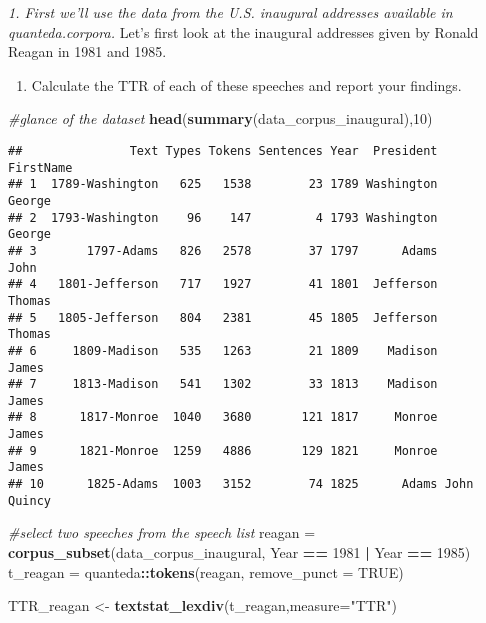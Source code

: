 \documentclass[]{article}
\newenvironment{Shaded}{\begin{snugshade}}{\end{snugshade}}
\newcommand{\KeywordTok}[1]{\textcolor[rgb]{0.13,0.29,0.53}{\textbf{#1}}}
\newcommand{\DataTypeTok}[1]{\textcolor[rgb]{0.13,0.29,0.53}{#1}}
\newcommand{\DecValTok}[1]{\textcolor[rgb]{0.00,0.00,0.81}{#1}}
\newcommand{\StringTok}[1]{\textcolor[rgb]{0.31,0.60,0.02}{#1}}
\newcommand{\CommentTok}[1]{\textcolor[rgb]{0.56,0.35,0.01}{\textit{#1}}}
\newcommand{\OtherTok}[1]{\textcolor[rgb]{0.56,0.35,0.01}{#1}}
\newcommand{\OperatorTok}[1]{\textcolor[rgb]{0.81,0.36,0.00}{\textbf{#1}}}
\newcommand{\NormalTok}[1]{#1}
\providecommand{\tightlist}{%
  \setlength{\itemsep}{0pt}\setlength{\parskip}{0pt}}
\begin{document}
\emph{1. First we'll use the data from the U.S. inaugural addresses
available in quanteda.corpora.} Let's first look at the inaugural
addresses given by Ronald Reagan in 1981 and 1985.

\begin{enumerate}
\def\labelenumi{(\alph{enumi})}
\tightlist
\item
  Calculate the TTR of each of these speeches and report your findings.
\end{enumerate}

\begin{Shaded}
\begin{Highlighting}[]
\CommentTok{#glance of the dataset}
\KeywordTok{head}\NormalTok{(}\KeywordTok{summary}\NormalTok{(data_corpus_inaugural),}\DecValTok{10}\NormalTok{)}
\end{Highlighting}
\end{Shaded}

\begin{verbatim}
##               Text Types Tokens Sentences Year  President   FirstName
## 1  1789-Washington   625   1538        23 1789 Washington      George
## 2  1793-Washington    96    147         4 1793 Washington      George
## 3       1797-Adams   826   2578        37 1797      Adams        John
## 4   1801-Jefferson   717   1927        41 1801  Jefferson      Thomas
## 5   1805-Jefferson   804   2381        45 1805  Jefferson      Thomas
## 6     1809-Madison   535   1263        21 1809    Madison       James
## 7     1813-Madison   541   1302        33 1813    Madison       James
## 8      1817-Monroe  1040   3680       121 1817     Monroe       James
## 9      1821-Monroe  1259   4886       129 1821     Monroe       James
## 10      1825-Adams  1003   3152        74 1825      Adams John Quincy
\end{verbatim}

\begin{Shaded}
\begin{Highlighting}[]
\CommentTok{#select two speeches from the speech list}
\NormalTok{reagan =}\StringTok{ }\KeywordTok{corpus_subset}\NormalTok{(data_corpus_inaugural, Year }\OperatorTok{==}\StringTok{ }\DecValTok{1981} \OperatorTok{|}\StringTok{ }\NormalTok{Year }\OperatorTok{==}\StringTok{ }\DecValTok{1985}\NormalTok{)}
\NormalTok{t_reagan =}\StringTok{ }\NormalTok{quanteda}\OperatorTok{::}\KeywordTok{tokens}\NormalTok{(reagan, }\DataTypeTok{remove_punct =} \OtherTok{TRUE}\NormalTok{)}

\NormalTok{TTR_reagan <-}\StringTok{ }\KeywordTok{textstat_lexdiv}\NormalTok{(t_reagan,}\DataTypeTok{measure=}\StringTok{"TTR"}\NormalTok{)}
\end{Highlighting}
\end{Shaded}
\end{document}
